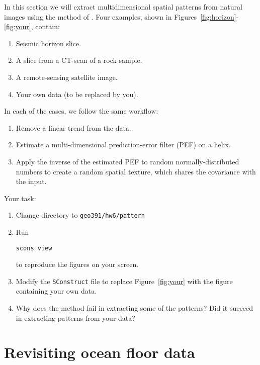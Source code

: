 In this section we will extract multidimensional spatial patterns from
natural images using the method of \cite{textures}. Four examples,
shown in Figures~\ref{fig:horizon}-\ref{fig:your}, contain:
\begin{enumerate}
\item Seismic horizon slice.
\item A slice from a CT-scan of a rock sample.
\item A remote-sensing satellite image.
\item Your own data (to be replaced by you).
\end{enumerate}
In each of the cases, we follow the same workflow:
\begin{enumerate}
\item Remove a linear trend from the data.
\item Estimate a multi-dimensional prediction-error filter (PEF) on a helix.
\item Apply the inverse of the estimated PEF to random normally-distributed numbers
  to create a random spatial texture, which shares the covariance with the input. 
\end{enumerate}


\lstset{language=python,numbers=left,numberstyle=\tiny,showstringspaces=false}


Your task:
\begin{enumerate}
\item Change directory to \verb#geo391/hw6/pattern#
\item Run 
\begin{verbatim}
scons view
\end{verbatim}
to reproduce the figures on your screen.
\item Modify the \texttt{SConstruct} file to replace Figure~\ref{fig:your} with the figure containing your own data.
\item Why does the method fail in extracting some of the patterns? Did it succeed in extracting patterns from your data?
\end{enumerate}

\section{Revisiting ocean floor data}


